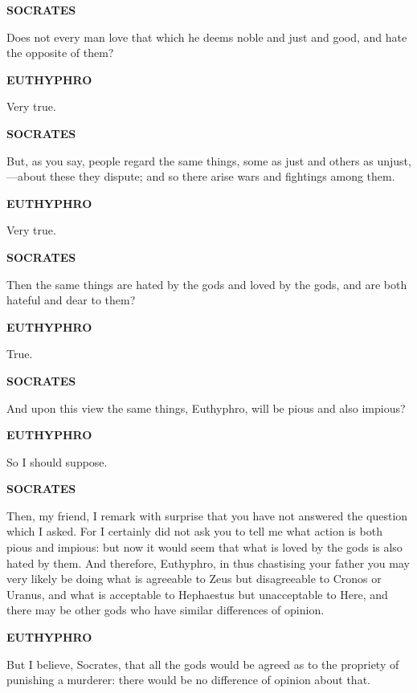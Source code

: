 \documentclass[11pt,letter]{article}
\begin{document}
\par \textbf{SOCRATES}
\par   Does not every man love that which he deems noble and just and good, and hate the opposite of them?

\par \textbf{EUTHYPHRO}
\par   Very true.

\par \textbf{SOCRATES}
\par   But, as you say, people regard the same things, some as just and others as unjust,—about these they dispute; and so there arise wars and fightings among them.

\par \textbf{EUTHYPHRO}
\par   Very true.

\par \textbf{SOCRATES}
\par   Then the same things are hated by the gods and loved by the gods, and are both hateful and dear to them?

\par \textbf{EUTHYPHRO}
\par   True.

\par \textbf{SOCRATES}
\par   And upon this view the same things, Euthyphro, will be pious and also impious?

\par \textbf{EUTHYPHRO}
\par   So I should suppose.

\par \textbf{SOCRATES}
\par   Then, my friend, I remark with surprise that you have not answered the question which I asked. For I certainly did not ask you to tell me what action is both pious and impious:  but now it would seem that what is loved by the gods is also hated by them. And therefore, Euthyphro, in thus chastising your father you may very likely be doing what is agreeable to Zeus but disagreeable to Cronos or Uranus, and what is acceptable to Hephaestus but unacceptable to Here, and there may be other gods who have similar differences of opinion.

\par \textbf{EUTHYPHRO}
\par   But I believe, Socrates, that all the gods would be agreed as to the propriety of punishing a murderer:  there would be no difference of opinion about that.
\end{document}
